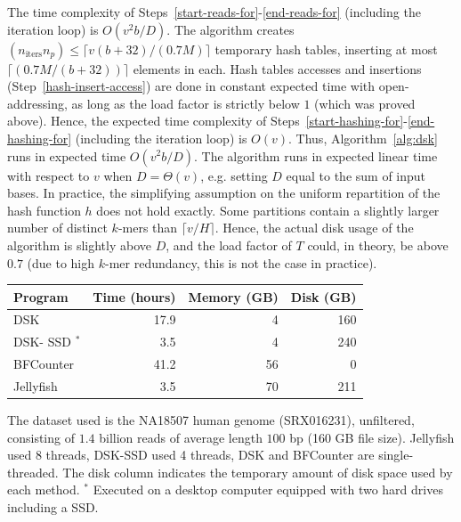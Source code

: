 \documentclass{bioinfo}
\newcommand{\dsk}{DSK\xspace}
\newcommand{\bfc}{BFCounter\xspace}
\begin{document}
\begin{methods}
The time complexity of Steps~\ref{start-reads-for}-\ref{end-reads-for} (including the iteration loop) is $O(v^2b / D)$. The algorithm creates $(n_\textrm{iters} n_p) \leq \lceil v (b+32) / (0.7 M) \rceil $ temporary hash tables, inserting at most $\lceil (0.7 M/(b+32)) \rceil$ elements in each. Hash tables accesses and insertions (Step~\ref{hash-insert-access}) are done in constant expected time with open-addressing, as long as the load factor is strictly below $1$ (which was proved above). Hence, the expected time complexity of Steps~\ref{start-hashing-for}-\ref{end-hashing-for} (including the iteration loop) is $O(v)$. Thus, Algorithm~\ref{alg:dsk} runs in expected time $O(v^2b/D).$ The algorithm runs in expected linear time with respect to $v$ when $D=\Theta(v)$, e.g. setting $D$ equal to the sum of input bases.
In practice, the simplifying assumption on the uniform repartition of the hash function $h$ does not hold exactly. Some partitions contain a slightly larger number of distinct $k$-mers than $\lceil v/H \rceil$. Hence, the actual disk usage of the algorithm is slightly above $D$, and the load factor of $T$ could, in theory, be above $0.7$ (due to high $k$-mer redundancy, this is not the case in practice).

\end{methods}

\begin{table}[t]
{\begin{tabular}{lrrr}\toprule
Program & Time (hours) & Memory (GB) & Disk (GB)\\\midrule
\dsk & 17.9 & 4 & 160 \\  %
\dsk - SSD $^*$ & 3.5 & 4 & 240 \\ 
BFCounter & 41.2 & 56 & 0\\ %
Jellyfish & 3.5 & 70  & 211\\ %


\end{tabular}}{The dataset used is the NA18507 human genome (SRX016231), unfiltered, consisting of $1.4$ billion reads of average length $100$ bp (160 GB file size). Jellyfish used 8 threads, \dsk-SSD used 4 threads, \dsk and \bfc are single-threaded. The disk column indicates the temporary amount of disk space used by each method. $^*$ Executed on a desktop computer equipped with two hard drives including a SSD.}
\end{table}
\end{document}
